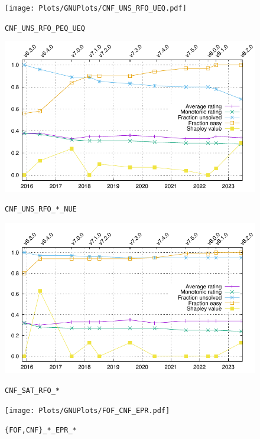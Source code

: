 \documentclass[runningheads]{llncs}
\begin{document}
\begin{figure}[h!]
\centering
\begin{minipage}[t]{.49\textwidth}
  \centering
  \texttt{[image: Plots/GNUPlots/CNF\_UNS\_RFO\_UEQ.pdf]}
  \vspace*{-2em}
  \caption{{\tt CNF\_UNS\_RFO\_PEQ\_UEQ}}
  \label{Plot_CNF_UEQ}
\end{minipage}
\begin{minipage}[t]{.49\textwidth}
  \centering
  \includegraphics[width=\textwidth]{Plots/GNUPlots/CNF_UNS_RFO_NUE.pdf}
  \vspace*{-2em}
  \caption{{\tt CNF\_UNS\_RFO\_*\_NUE}}
  \label{Plot_CNF_UNS}
\end{minipage}
\begin{minipage}[t]{.49\textwidth}
  \centering
  \includegraphics[width=\textwidth]{Plots/GNUPlots/CNF_SAT_RFO.pdf}
  \vspace*{-2em}
  \caption{{\tt CNF\_SAT\_RFO\_*}}
  \label{Plot_CNF_SAT}
\end{minipage}
\begin{minipage}[t]{.49\textwidth}
  \centering
  \texttt{[image: Plots/GNUPlots/FOF\_CNF\_EPR.pdf]}
  \vspace*{-2em}
  \caption{{\tt \{FOF,CNF\}\_*\_EPR\_*}}
  \label{Plot_FOF_CNF_EPR}
\end{minipage}
\end{figure}
\end{document}
